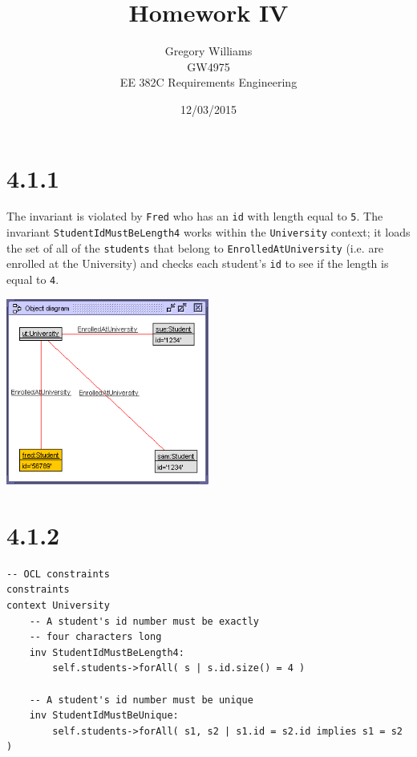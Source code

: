 \documentclass{article}
\title{Homework IV}
\author{Gregory Williams\\GW4975\\EE 382C Requirements Engineering}
\date{12/03/2015}
\begin{document}
	\maketitle
	
	\section*{4.1.1}
	The invariant is violated by \texttt{Fred} who has an \texttt{id} with length equal to \texttt{5}. The invariant \texttt{StudentIdMustBeLength4} works within the \texttt{University} context; it loads the set of all of the \texttt{students} that belong to \texttt{EnrolledAtUniversity} (i.e. are enrolled at the University) and checks each student's \texttt{id} to see if the length is equal to \texttt{4}.\\
\begin{center}
\includegraphics[width=0.5\textwidth]{Media/UniversityObjectDiagram}
\end{center}
	\section*{4.1.2}
\begin{lstlisting}
-- OCL constraints
constraints
context University
	-- A student's id number must be exactly
	-- four characters long
	inv StudentIdMustBeLength4:
		self.students->forAll( s | s.id.size() = 4 )

	-- A student's id number must be unique
	inv StudentIdMustBeUnique:
		self.students->forAll( s1, s2 | s1.id = s2.id implies s1 = s2 )
\end{lstlisting}
	
\end{document}

